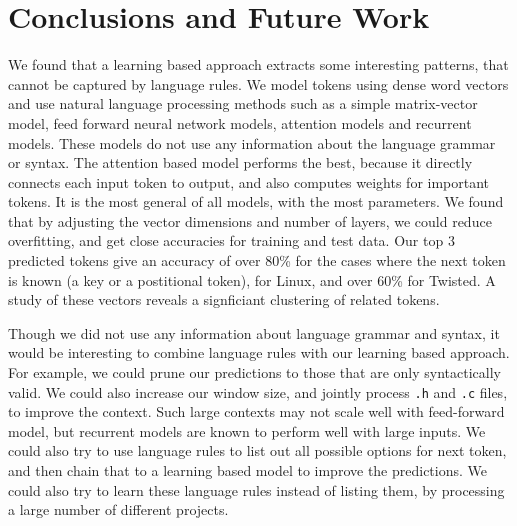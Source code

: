 \section{Conclusions and Future Work}
\label{sec:conclusions}

We found that a learning based approach extracts some interesting patterns,
that cannot be captured by language rules.
We model tokens using dense word vectors and use natural language processing
methods such as 
a simple matrix-vector model, feed forward neural network models,
attention models and recurrent models.
These models do not use any information about the language grammar or syntax.
The attention based model performs the best, because it directly connects each
input token to output, and also computes weights for important tokens. It is
the most general of all models, with the most parameters.
We found that by adjusting the vector dimensions and number of layers, we could
reduce overfitting, and get close accuracies for training and test data.
Our top 3 predicted tokens give an accuracy of over 80\% for the cases where
the next token is known (a key or a postitional token), for Linux,
and over 60\% for Twisted.
A study of these vectors reveals a signficiant clustering of related tokens.

Though we did not use any information about language grammar and syntax, it
would be interesting to combine language rules with our learning based
approach. For example, we could prune our predictions to those that are only
syntactically valid. We could also increase our window size, and jointly
process \texttt{.h} and \texttt{.c} files, to improve the context. Such large
contexts may not scale well with feed-forward model, but recurrent models are
known to perform well with large inputs. We could also try to use language
rules to list out all possible options for next token, and then chain that to a
learning based model to improve the predictions. We could also try to learn
these language rules instead of listing them, by processing a large number of
different projects.
